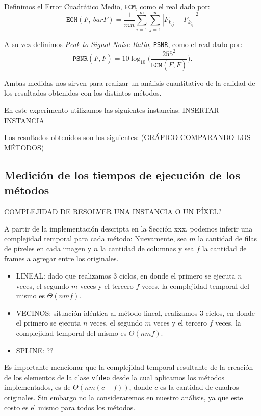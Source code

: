 Definimos el Error Cuadrático Medio, \texttt{ECM}, como el real dado por:
\begin{equation}
\texttt{ECM}(F,\ bar{F}) = \frac{1}{mn}\sum_{i=1}^m\sum_{j = 1}^n |F_{k_{ij}} - \bar{F}_{k_{ij}}|^2
\end{equation}

A su vez definimos \emph{Peak to Signal Noise Ratio}, \texttt{PSNR}, como el real dado por:
\begin{equation}
\texttt{PSNR}(F,\bar{F}) = 10 \log_{10}\bigg(\frac{255^2}{\texttt{ECM}(F,\bar{F})}\bigg). \label{eq:psnr}
\end{equation}

Ambas medidas nos sirven para realizar un análisis cuantitativo de la calidad de los resultados obtenidos con los distintos métodos.

En este experimento utilizamos las siguientes instancias:
INSERTAR INSTANCIA

Los resultados obtenidos son los siguientes: (GRÁFICO COMPARANDO LOS MÉTODOS)

\subsection{Medición de los tiempos de ejecución de los métodos}
COMPLEJIDAD DE RESOLVER UNA INSTANCIA O UN PÍXEL?

A partir de la implementación descripta en la Sección xxx, podemos inferir una complejidad temporal para cada método:
Nuevamente, sea $m$ la cantidad de filas de píxeles en cada imagen y $n$ la cantidad de columnas y sea $f$ la cantidad de frames a agregar entre los originales.
\begin{itemize}
  \item LINEAL: dado que realizamos 3 ciclos, en donde el primero se ejecuta $n$ veces, el segundo $m$ veces y el tercero $f$ veces, la complejidad temporal del mismo es $\Theta(nmf)$.
  \item VECINOS: situación idéntica al método lineal, realizamos 3 ciclos, en donde el primero se ejecuta $n$ veces, el segundo $m$ veces y el tercero $f$ veces, la complejidad temporal del mismo es $\Theta(nmf)$.
  \item SPLINE: ??
\end{itemize}
Es importante mencionar que la complejidad temporal resultante de la creación de los elementos de la clase \texttt{vídeo} desde la cual aplicamos los métodos implementados, es de $\Theta(nm(c+f))$, donde $c$ es la cantidad de cuadros originales.
Sin embargo no la consideraremos en nuestro análisis, ya que este costo es el mismo para todos los métodos.

